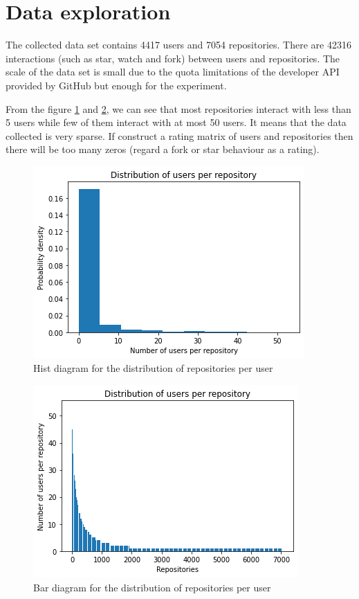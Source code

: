 \documentclass[11pt,twoside]{report}
\begin{document}
\section{Data exploration}
The collected data set contains 4417 users and 7054 repositories. There are 42316 interactions (such as star, watch and fork) between users and repositories. The scale of the data set is small due to the quota limitations of the developer API provided by GitHub but enough for the experiment.

From the figure \ref{fig:user_repo_dist_hist} and \ref{fig:user_repo_dist_bar}, we can see that most repositories interact with less than 5 users while few of them interact with at most 50 users. It means that the data collected is very sparse. If construct a rating matrix of users and repositories then there will be too many zeros (regard a fork or star behaviour as a rating).

\begin{figure}[H]
    \centering
    \includegraphics[scale=0.9]{user_repo_dist_hist.png}
    \caption{Hist diagram for the distribution of repositories per user}
    \label{fig:user_repo_dist_hist}
\end{figure}

\begin{figure}[H]
    \centering
    \includegraphics[scale=0.9]{user_repo_dist_bar.png}
    \caption{Bar diagram for the distribution of repositories per user}
    \label{fig:user_repo_dist_bar}
\end{figure}
\end{document}
